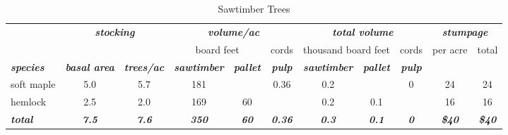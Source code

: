 \documentclass[landscape]{article}
\begin{document}
\begin{table}[H]

\caption{\label{tab:unnamed-chunk-26}Sawtimber Trees}
\fontsize{10}{12}\selectfont
\begin{tabular}[t]{lcccccccccc}
\toprule
\multicolumn{1}{c}{\em{\textbf{ }}} & \multicolumn{2}{c}{\em{\textbf{stocking}}} & \multicolumn{3}{c}{\em{\textbf{volume/ac }}} & \multicolumn{3}{c}{\em{\textbf{total volume}}} & \multicolumn{2}{c}{\em{\textbf{stumpage}}} \\
\cmidrule(l{3pt}r{3pt}){2-3} \cmidrule(l{3pt}r{3pt}){4-6} \cmidrule(l{3pt}r{3pt}){7-9} \cmidrule(l{3pt}r{3pt}){10-11}
\multicolumn{3}{c}{ } & \multicolumn{2}{c}{board feet} & \multicolumn{1}{c}{cords} & \multicolumn{2}{c}{thousand board feet} & \multicolumn{1}{c}{cords} & \multicolumn{1}{c}{per acre} & \multicolumn{1}{c}{total} \\
\cmidrule(l{3pt}r{3pt}){4-5} \cmidrule(l{3pt}r{3pt}){6-6} \cmidrule(l{3pt}r{3pt}){7-8} \cmidrule(l{3pt}r{3pt}){9-9} \cmidrule(l{3pt}r{3pt}){10-10} \cmidrule(l{3pt}r{3pt}){11-11}
\rowcolor[HTML]{DCDCDC}  \em{\textbf{species}} & \em{\textbf{basal area}} & \em{\textbf{trees/ac}} & \em{\textbf{sawtimber}} & \em{\textbf{pallet}} & \em{\textbf{pulp}} & \em{\textbf{sawtimber}} & \em{\textbf{pallet}} & \em{\textbf{pulp}} & \em{\textbf{ }} & \em{\textbf{ }}\\
\midrule
\rowcolor{gray!6}  soft maple & 5.0 & 5.7 & 181 &  & 0.36 & 0.2 &  & 0 & 24 & 24\\
 
hemlock & 2.5 & 2.0 & 169 & 60 &  & 0.2 & 0.1 &  & 16 & 16\\
 
\rowcolor{gray!6}  \rowcolor[HTML]{DCDCDC}  \em{\textbf{total}} & \em{\textbf{7.5}} & \em{\textbf{7.6}} & \em{\textbf{350}} & \em{\textbf{60}} & \em{\textbf{0.36}} & \em{\textbf{0.3}} & \em{\textbf{0.1}} & \em{\textbf{0}} & \em{\textbf{\$40}} & \em{\textbf{\$40}}\\
\bottomrule
\end{tabular}
\end{table}
\end{document}

